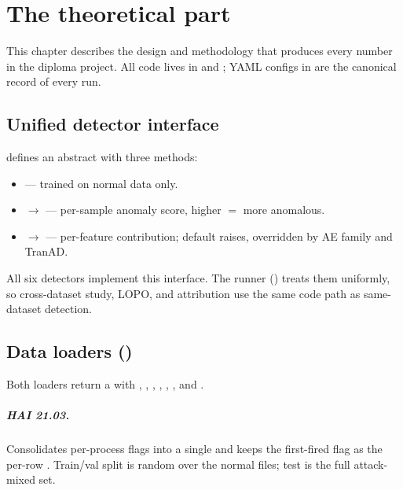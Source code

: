 \chapter{The theoretical part}
\label{ch:method}

This chapter describes the design and methodology that produces every number in the diploma project.  All code lives in  and ; YAML configs in  are the canonical record of every run.

\section{Unified detector interface}

 defines an abstract  with three methods:
\begin{itemize}
  \item {} --- trained on normal data only.
  \item {}$\rightarrow$ --- per-sample anomaly score, higher $=$ more anomalous.
  \item {}$\rightarrow$ --- per-feature contribution; default raises, overridden by AE family and TranAD.
\end{itemize}

All six detectors implement this interface.  The runner () treats them uniformly, so cross-dataset study, LOPO, and attribution use the same code path as same-dataset detection.

\section{Data loaders ()}

Both loaders return a  with , , , , , , and .

\paragraph{HAI 21.03.}  Consolidates per-process  flags into a single  and keeps the first-fired flag as the per-row .  Train/val split is random over the normal  files; test is the full attack-mixed set.

